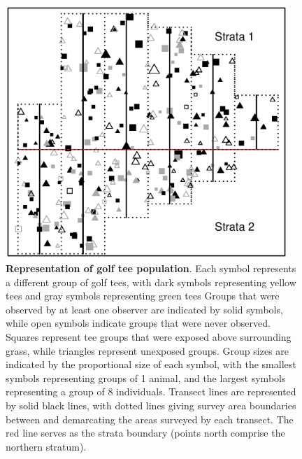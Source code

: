 \documentclass[10pt]{article}
\begin{document}
\begin{figure}
\begin{center}
\includegraphics[width=0.95\textwidth]{golf_tee.eps}
\end{center}
\caption{{\bf Representation of golf tee population}. Each symbol represents a different group of golf tees, with dark symbols representing yellow tees and gray symbols representing green tees  Groups that were observed by at least one observer are indicated by solid symbols, while open symbols indicate groups that were never observed.  Squares represent tee groups that were exposed above surrounding grass, while triangles represent unexposed groups.
Group sizes are indicated by the proportional size of each symbol, with the smallest symbols representing groups of 1 animal, and the largest symbols representing a group of 8 individuals.  Transect lines are represented by solid black lines, with dotted lines giving survey area boundaries between and demarcating the areas surveyed by each transect.  The red line serves as the strata boundary (points north comprise the northern stratum).}
\label{fig:tee_landscape}
\end{figure}
\clearpage
\end{document}
